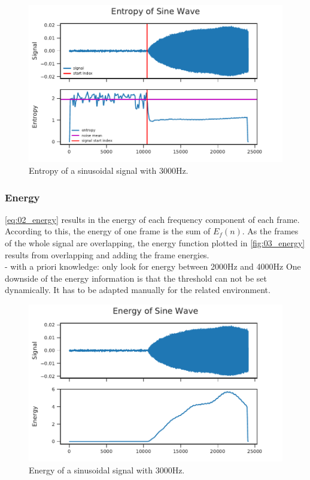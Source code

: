 \begin{figure}[ht]
	\centering
		\includegraphics[]{figures/sine_entropy}
	\caption{Entropy of a sinusoidal signal with 3000Hz.}
\end{figure}
\label{fig:03_entropy}

\subsubsection*{Energy}

\ref{eq:02_energy} results in the energy of each frequency component of each frame.
According to this, the energy of one frame is the sum of $E_f(n)$.
As the frames of the whole signal are overlapping, the energy function plotted in
\ref{fig:03_energy} results from overlapping and adding the frame energies.\\
- with a priori knowledge: only look for energy between 2000Hz and 4000Hz
One downside of the energy information is that the threshold can not be
set dynamically. It has to be adapted manually for the related environment.


\begin{figure}[ht]
	\centering
		\includegraphics[]{figures/sine_energy}
	\caption{Energy of a sinusoidal signal with 3000Hz.}
\end{figure}
\label{fig:03_energy}

